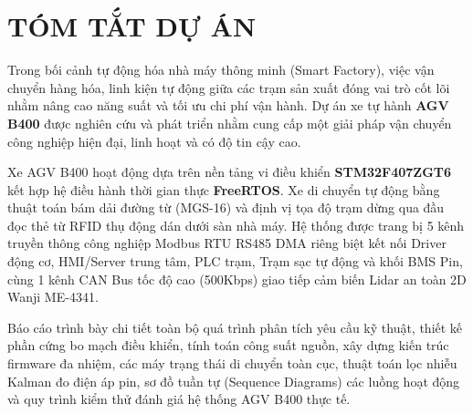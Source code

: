 \documentclass{article}
\begin{document}

\thispagestyle{empty}
\newpage






\tableofcontents 
\thispagestyle{empty}
\cleardoublepage
\newpage

{\let\oldnumberline\numberline
\renewcommand{\numberline}{Hình~\oldnumberline}
\listoffigures} 
\newpage

{\let\oldnumberline\numberline
\renewcommand{\numberline}{Bảng~\oldnumberline}
\listoftables}
\newpage


\newpage

\section*{TÓM TẮT DỰ ÁN}

Trong bối cảnh tự động hóa nhà máy thông minh (Smart Factory), việc vận chuyển hàng hóa, linh kiện tự động giữa các trạm sản xuất đóng vai trò cốt lõi nhằm nâng cao năng suất và tối ưu chi phí vận hành. Dự án xe tự hành \textbf{AGV B400} được nghiên cứu và phát triển nhằm cung cấp một giải pháp vận chuyển công nghiệp hiện đại, linh hoạt và có độ tin cậy cao.

Xe AGV B400 hoạt động dựa trên nền tảng vi điều khiển \textbf{STM32F407ZGT6} kết hợp hệ điều hành thời gian thực \textbf{FreeRTOS}. Xe di chuyển tự động bằng thuật toán bám dải đường từ (MGS-16) và định vị tọa độ trạm dừng qua đầu đọc thẻ từ RFID thụ động dán dưới sàn nhà máy. Hệ thống được trang bị 5 kênh truyền thông công nghiệp Modbus RTU RS485 DMA riêng biệt kết nối Driver động cơ, HMI/Server trung tâm, PLC trạm, Trạm sạc tự động và khối BMS Pin, cùng 1 kênh CAN Bus tốc độ cao (500Kbps) giao tiếp cảm biến Lidar an toàn 2D Wanji ME-4341.

Báo cáo trình bày chi tiết toàn bộ quá trình phân tích yêu cầu kỹ thuật, thiết kế phần cứng bo mạch điều khiển, tính toán công suất nguồn, xây dựng kiến trúc firmware đa nhiệm, các máy trạng thái di chuyển toàn cục, thuật toán lọc nhiễu Kalman đo điện áp pin, sơ đồ tuần tự (Sequence Diagrams) các luồng hoạt động và quy trình kiểm thử đánh giá hệ thống AGV B400 thực tế.
\end{document}
